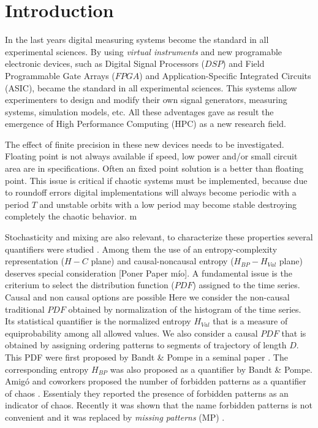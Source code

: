 \section{Introduction} \label{sec:intro}

In the last years digital measuring systems become the standard in all experimental sciences.
By using \textit{virtual instruments} and new programable electronic devices, such as Digital Signal Processors ($DSP$) and Field Programmable Gate Arrays ($FPGA$) and Application-Specific Integrated Circuits (ASIC), became the standard in all experimental sciences.
This systems allow experimenters to design and modify their own signal generators, measuring systems, simulation models, etc.
All these adventages gave as result the emergence of High Performance Computing (HPC) as a new research field.

The effect of finite precision in these new devices needs to be investigated.
Floating point is not always available if speed, low power and/or small circuit area are in specifications.
Often an fixed point solution is a better than floating point.
This issue is critical if chaotic systems must be implemented, because due to roundoff errors digital implementations will always become periodic with a period $T$ and unstable orbits with a low period may become stable destroying completely the chaotic behavior.  m

Stochasticity and mixing are also relevant, to characterize these properties several quantifiers were studied \cite{DeMicco2009}.
Among them the use of an entropy-complexity representation ($H-C$ plane) and causal-noncausal entropy ($H_{BP}-H_{Val}$ plane) deserves special consideration \cite{Rosso2007C,DeMicco2008,DeMicco2011,DeMicco2009,Rosso2009}[Poner Paper mío].
A fundamental issue is the criterium to select the distribution function ($PDF$) assigned to the time series.
Causal and non causal options are possible
Here we consider the non-causal traditional $PDF$ obtained by normalization of the histogram of the time series.
Its statistical quantifier is the normalized entropy $H_{Val}$ that is a measure of equiprobability among all allowed values.
We also consider a causal $PDF$ that is obtained by assigning ordering patterns to segments of trajectory of length $D$.
This PDF were first proposed by Bandt \& Pompe in a seminal paper \cite{Pompe2002}.
The corresponding entropy $H_{BP}$ was also proposed as a quantifier by Bandt \& Pompe.
Amig\'o and coworkers proposed the number of forbidden patterns as a quantifier of chaos \cite{Amigo2007b}.
Essentialy they reported the presence of forbidden patterns as an indicator of chaos.
Recently it was shown that the name forbidden patterns is not convenient and it was replaced by \textit{missing patterns }(MP) \cite{Rosso2012b}.

